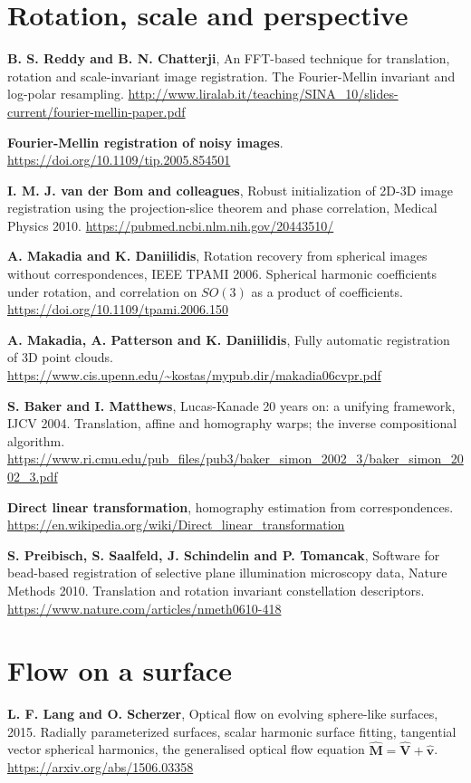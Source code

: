 \section*{Rotation, scale and perspective}

\textbf{B. S. Reddy and B. N. Chatterji}, An FFT-based technique for translation, rotation and
scale-invariant image registration. The Fourier-Mellin invariant and log-polar resampling.
\url{http://www.liralab.it/teaching/SINA_10/slides-current/fourier-mellin-paper.pdf}

\textbf{Fourier-Mellin registration of noisy images}.
\url{https://doi.org/10.1109/tip.2005.854501}

\textbf{I. M. J. van der Bom and colleagues}, Robust initialization of 2D-3D image registration using
the projection-slice theorem and phase correlation, Medical Physics 2010.
\url{https://pubmed.ncbi.nlm.nih.gov/20443510/}

\textbf{A. Makadia and K. Daniilidis}, Rotation recovery from spherical images without
correspondences, IEEE TPAMI 2006. Spherical harmonic coefficients under rotation, and correlation on
\(SO(3)\) as a product of coefficients. \url{https://doi.org/10.1109/tpami.2006.150}

\textbf{A. Makadia, A. Patterson and K. Daniilidis}, Fully automatic registration of 3D point clouds.
\url{https://www.cis.upenn.edu/~kostas/mypub.dir/makadia06cvpr.pdf}

\textbf{S. Baker and I. Matthews}, Lucas-Kanade 20 years on: a unifying framework, IJCV 2004.
Translation, affine and homography warps; the inverse compositional algorithm.
\url{https://www.ri.cmu.edu/pub_files/pub3/baker_simon_2002_3/baker_simon_2002_3.pdf}

\textbf{Direct linear transformation}, homography estimation from correspondences.
\url{https://en.wikipedia.org/wiki/Direct_linear_transformation}

\textbf{S. Preibisch, S. Saalfeld, J. Schindelin and P. Tomancak}, Software for bead-based registration
of selective plane illumination microscopy data, Nature Methods 2010. Translation and rotation
invariant constellation descriptors. \url{https://www.nature.com/articles/nmeth0610-418}

\section*{Flow on a surface}

\textbf{L. F. Lang and O. Scherzer}, Optical flow on evolving sphere-like surfaces, 2015. Radially
parameterized surfaces, scalar harmonic surface fitting, tangential vector spherical harmonics, the
generalised optical flow equation \(\hat{\mathbf{M}} = \hat{\mathbf{V}} + \hat{\mathbf{v}}\).
\url{https://arxiv.org/abs/1506.03358}

